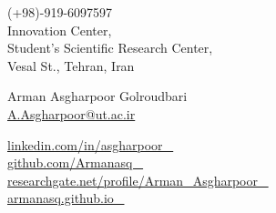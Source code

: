 \documentclass[a4,15pt]{article}
\begin{document}
\begin{center}
    \begin{minipage}[b]{0.34\textwidth}
            \normalsize (+98)-919-6097597 \\
            \small Innovation Center, \\ Student’s Scientific Research Center, \\ Vesal St., Tehran, Iran
    \end{minipage}%
    \begin{minipage}[b]{0.34\textwidth}
            \centering
            {\huge Arman Asgharpoor Golroudbari} \\ %
            \vspace{0.1cm}
            \large \href{mailto:A.Asgharpoor@ut.ac.ir}{A.Asgharpoor@ut.ac.ir} \\
    \end{minipage}%
    \begin{minipage}[b]{0.31\textwidth}
            \flushright \large  %
            {\href{https://linkedin.com/in/asgharpoor/}{ \footnotesize linkedin.com/in/asgharpoor \faLinkedin\ }} \\
            {\href{https://github.com/Armanasq}{ \footnotesize github.com/Armanasq \faGithubSquare\ }}\\
            {\href{https://www.researchgate.net/profile/Arman_Asgharpoor}{ \footnotesize researchgate.net/profile/Arman\_Asgharpoor \aiResearchGateSquare\ }}\\
            {\href{http://armanasq.github.io/}{\footnotesize armanasq.github.io \faGlobe\ }}
    \end{minipage} 
     
\end{center}
\end{document}
